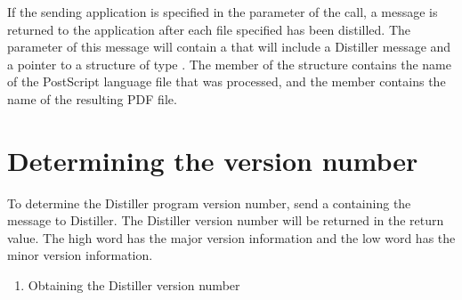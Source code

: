 \documentclass[letterpaper,12pt,english,openany,oneside]{sphinxmanual}
\begin{document}
If the sending application is specified in the  parameter of the  call, a  message is returned to the application after each file specified has been distilled. The  parameter of this  message will contain a  that will include a Distiller  message and a pointer to a structure of type  . The  member of the structure contains the name of the PostScript language file that was processed, and the  member contains the name of the resulting PDF file.


\section{Determining the version number}
\label{\detokenize{Distiller_WinIntro:determining-the-version-number}}
To determine the Distiller program version number, send a  containing the  message to Distiller. The Distiller version number will be returned in the return value. The high word has the major version information and the low word has the minor version information.
\begin{enumerate}
%
\item {} 
Obtaining the Distiller version number

\end{enumerate}
\end{document}
